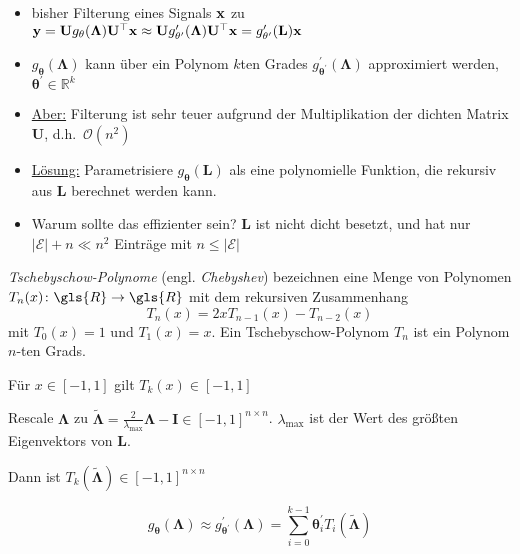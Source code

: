 \begin{itemize}
  \item bisher Filterung eines Signals $\mathbf{x}$ zu $\ve{y} = \ma{U}g_{\mathbf{\theta}}\left(\ma{\Lambda}\right)\mathbf{U}^{\top}\ve{x} \approx \ma{U}g^{\prime}_{\ma{\theta}^{\prime}}\left(\ma{\Lambda}\right)\ma{U}^{\top}\ve{x} = g^{\prime}_{\ma{\theta}^{\prime}}\left(\ma{L}\right)\ve{x}$
  \item $g_{\mathbf{\theta}}\left(\mathbf{\Lambda}\right)$ kann über ein Polynom $k$ten Grades $g^{\prime}_{\mathbf{\theta}^{\prime}}\left(\mathbf{\Lambda}\right)$ approximiert werden, $\mathbf{\theta}^{\prime} \in \mathbb{R}^k$
  \item \underline{Aber:} Filterung ist sehr teuer aufgrund der Multiplikation der dichten Matrix $\mathbf{U}$, d.h.\ $\mathcal{O}\left(n^2\right)$
  \item \underline{Lösung:} Parametrisiere $g_{\mathbf{\theta}}\left(\mathbf{L}\right)$ als eine polynomielle Funktion, die rekursiv aus $\mathbf{L}$ berechnet werden kann.
  \item Warum sollte das effizienter sein? $\mathbf{L}$ ist nicht dicht besetzt, und hat nur $\left|\mathcal{E}\right| + n \ll n^2$ Einträge mit $n \leq \left|\mathcal{E}\right|$
\end{itemize}

\emph{Tschebyschow-Polynome} (engl. \emph{Chebyshev}) bezeichnen eine Menge von Polynomen $T_n\left(x\right) \colon \gls{R} \to \gls{R}$ mit dem rekursiven Zusammenhang
\begin{equation}
  T_n\left(x\right) = 2x T_{n-1}\left(x\right) - T_{n-2}\left(x\right)
\end{equation}
mit $T_0\left(x\right) = 1$ und $T_1\left(x\right) = x$.
Ein Tschebyschow-Polynom $T_n$ ist ein Polynom $n$-ten Grads.

Für $x \in \left[-1, 1\right]$ gilt $T_k\left(x\right) \in \left[-1, 1\right]$

Rescale $\mathbf{\Lambda}$ zu $\mathbf{\tilde \Lambda} = \frac{2}{\lambda_{\max}} \mathbf{\Lambda} - \mathbf{I} \in {\left[-1, 1\right]}^{n \times n}$.
$\lambda_{\max}$ ist der Wert des größten Eigenvektors von $\mathbf{L}$.

Dann ist $T_k\left(\mathbf{\tilde \Lambda}\right) \in {\left[-1, 1\right]}^{n \times n}$

\begin{equation}
  g_{\mathbf{\theta}}\left(\mathbf{\Lambda}\right) \approx g^{\prime}_{\mathbf{\theta}^{\prime}}\left(\mathbf{\Lambda}\right) = \sum_{i = 0}^{k-1} \mathbf{\theta}^{\prime}_i T_i \left(\mathbf{\tilde \Lambda}\right)
\end{equation}

